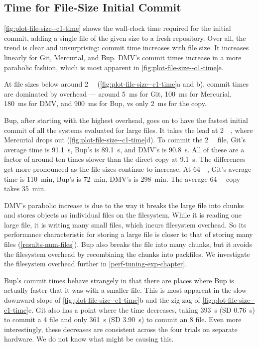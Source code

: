 \cleardoublepage

\subsection{Time for File-Size Initial Commit}
\label{results-file-size--c1-time}

\autoref{fig:plot-file-size--c1-time} shows the wall-clock time required for the
initial \gls{commit}, adding a single file of the given size to a fresh
\gls{repository}. Over all, the trend is clear and unsurprising: \gls{commit}
time increases with file size. It increases linearly for Git, Mercurial, and
Bup. DMV's commit times increase in a more parabolic fashion, which is most
apparent in \autoref{fig:plot-file-size--c1-time}e.

At file sizes below around \SI{2}{\mebi\byte}
(\autoref{fig:plot-file-size--c1-time}a and b), \gls{commit} times are dominated
by overhead --- around \SI{5}{\ms} for Git, \SI{100}{\ms} for Mercurial,
\SI{180}{\ms} for \gls{DMV}, and \SI{900}{\ms} for Bup, vs only \SI{2}{\ms} for
the copy.

Bup, after starting with the highest overhead, goes on to have the fastest
initial \gls{commit} of all the systems evaluated for large files. It takes the
lead at \SI{2}{\gibi\byte}, where Mercurial drops out
(\autoref{fig:plot-file-size--c1-time}d). To \gls{commit} the \SI{2}{\gibi\byte}
file, Git's average time is \SI{91.1}{\s}, Bup's is \SI{89.1}{\s}, and
\gls{DMV}'s is \SI{90.8}{\s}. All of these are a factor of around ten times
slower than the direct copy at \SI{9.1}{\s}. The differences get more pronounced
as the file sizes continue to increase. At \SI{64}{\gibi\byte}, Git's average
time is \SI{110}{\minute}, Bup's is \SI{72}{\minute}, \gls{DMV}'s is
\SI{298}{\minute}. The average \SI{64}{\gibi\byte} copy takes \SI{35}{\minute}.

DMV's parabolic increase is due to the way it breaks the large file into chunks
and stores objects as individual files on the filesystem. While it is reading
one large file, it is writing many small files, which incurs filesystem
overhead. So its performance characteristic for storing a large file is closer
to that of storing many files (\autoref{results-num-files}). Bup also breaks the
file into many chunks, but it avoids the filesystem overhead by recombining the
chunks into \glspl{packfile}. We investigate the filesystem overhead further in
\autoref{perf-tuning-exp-chapter}.

Bup's commit times behave strangely in that there are places where Bup is
actually faster that it was with a smaller file. This is most apparent in the
slow downward slope of \autoref{fig:plot-file-size--c1-time}b and the zig-zag of
\autoref{fig:plot-file-size--c1-time}c. Git also has a point where the time
decreases, taking \SI{393}{\s} (SD \SI{.76}{\s}) to commit a \SI{4}{\gib} file
and only \SI{361}{\s} (SD \SI{3.90}{\s}) to commit an \SI{8}{\gib} file. Even
more interestingly, these decreases are consistent across the four trials on
separate hardware. We do not know what might be causing this.

